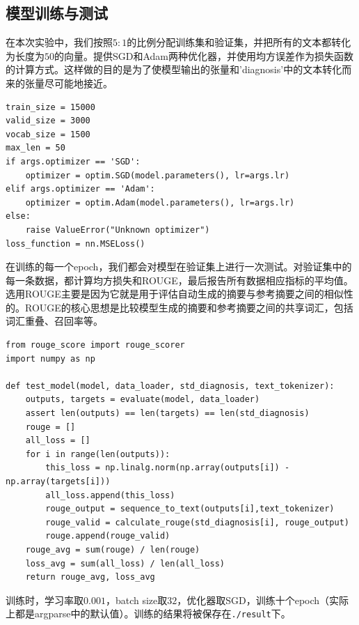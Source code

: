 \documentclass{article}
\begin{document}
\subsection{模型训练与测试}
在本次实验中，我们按照$5:1$的比例分配训练集和验证集，并把所有的文本都转化为长度为$50$的向量。提供SGD和Adam两种优化器，并使用均方误差作为损失函数的计算方式。这样做的目的是为了使模型输出的张量和'diagnosis'中的文本转化而来的张量尽可能地接近。
\begin{lstlisting}
train_size = 15000
valid_size = 3000
vocab_size = 1500
max_len = 50
if args.optimizer == 'SGD':
    optimizer = optim.SGD(model.parameters(), lr=args.lr)
elif args.optimizer == 'Adam':
    optimizer = optim.Adam(model.parameters(), lr=args.lr)
else:
    raise ValueError("Unknown optimizer")
loss_function = nn.MSELoss()
\end{lstlisting}
在训练的每一个epoch，我们都会对模型在验证集上进行一次测试。对验证集中的每一条数据，都计算均方损失和ROUGE，最后报告所有数据相应指标的平均值。选用ROUGE主要是因为它就是用于评估自动生成的摘要与参考摘要之间的相似性的。ROUGE的核心思想是比较模型生成的摘要和参考摘要之间的共享词汇，包括词汇重叠、召回率等。
\begin{lstlisting}
from rouge_score import rouge_scorer
import numpy as np

def test_model(model, data_loader, std_diagnosis, text_tokenizer):
    outputs, targets = evaluate(model, data_loader)
    assert len(outputs) == len(targets) == len(std_diagnosis)
    rouge = []
    all_loss = []
    for i in range(len(outputs)):
        this_loss = np.linalg.norm(np.array(outputs[i]) - np.array(targets[i]))
        all_loss.append(this_loss)
        rouge_output = sequence_to_text(outputs[i],text_tokenizer)
        rouge_valid = calculate_rouge(std_diagnosis[i], rouge_output)
        rouge.append(rouge_valid)
    rouge_avg = sum(rouge) / len(rouge)
    loss_avg = sum(all_loss) / len(all_loss)
    return rouge_avg, loss_avg
\end{lstlisting}
训练时，学习率取$0.001$，batch size取$32$，优化器取SGD，训练十个epoch（实际上都是argparse中的默认值）。训练的结果将被保存在\lstinline|./result|下。
\end{document}
